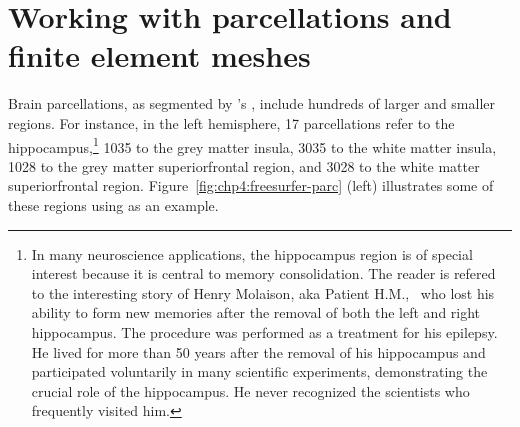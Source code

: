\section{Working with parcellations and finite element meshes} 
\label{sec:import-freesurfer-parcellation}
Brain parcellations, as segmented by {\freesurfer}'s ,
include hundreds of larger and smaller regions. For instance, in the
left hemisphere, 17 parcellations refer to the hippocampus,\footnote{In many
  neuroscience applications, the hippocampus region is of special
  interest because it is central to memory consolidation. The reader
  is refered to the interesting story of Henry Molaison, aka Patient
  H.M.,~\cite{squire2009legacy, scoville1957loss} who lost his ability
  to form new memories after the removal of both the left and right
  hippocampus. The procedure was performed as a treatment for his
  epilepsy. He lived for more than 50 years after the removal of his
  hippocampus and participated voluntarily in many scientific
  experiments, demonstrating the crucial role of the hippocampus. He
  never recognized the scientists who frequently visited him.} 1035
to the grey matter insula, 3035 to the white matter insula, 1028 to
the grey matter superiorfrontal region, and 3028 to the white matter
superiorfrontal region. Figure~\ref{fig:chp4:freesurfer-parc} (left) illustrates 
some of these regions using  as an example. 
%
%

